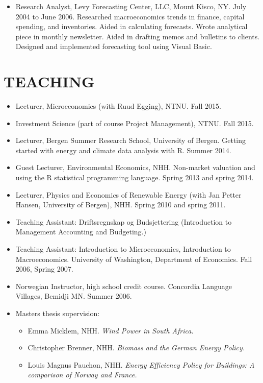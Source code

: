 \documentclass[margin]{res}
\begin{document}
\begin{resume}
\begin{itemize}
                  \item[] Research Analyst, Levy Forecasting Center, LLC, Mount Kisco, NY. July 2004 to June 2006.  
                  Researched macroeconomics trends in finance, capital spending, and inventories. Aided in calculating forecasts. Wrote analytical piece in monthly newsletter. Aided in drafting memos and bulletins to clients. Designed and implemented forecasting tool using Visual Basic. 

                  \end{itemize}
                   
\section{TEACHING} 
\begin{itemize}
\setlength{\itemsep}{10pt}
\item[] Lecturer, Microeconomics (with Ruud Egging), NTNU.  Fall 2015.
\item[] Investment Science (part of course Project Management), NTNU.  Fall 2015.
\item[] Lecturer, Bergen Summer Research School, University of Bergen.  Getting started with energy and climate data analysis with R.  Summer 2014.
\item[] Guest Lecturer, Environmental Economics, NHH.  Non-market valuation and using the R statistical programming language.  Spring 2013 and spring 2014.
\item[] Lecturer, Physics and Economics of Renewable Energy (with Jan Petter Hansen, University of Bergen), NHH.  Spring 2010 and spring 2011.
\item[] Teaching Assistant: Driftsregnskap og Budsjettering (Introduction to Management Accounting and Budgeting.)
\item[] Teaching Assistant: Introduction to Microeconomics, Introduction to Macroeconomics.  University of Washington, Department of Economics. Fall 2006, Spring 2007.
\item[] Norwegian Instructor, high school credit course.  Concordia Language Villages, Bemidji MN.  Summer 2006.  
\item [] Masters thesis supervision:
  \begin{itemize}
  \item[] Emma Micklem, NHH. \emph{Wind Power in South Africa.}
  \item[] Christopher Brenner, NHH. \emph{Biomass and the German Energy Policy.}
  \item[] Louis Magnus Pauchon, NHH. \emph{Energy Efficiency Policy for Buildings: A comparison of Norway and France.}

\end{itemize}
\end{itemize}
\end{resume}
\end{document}
